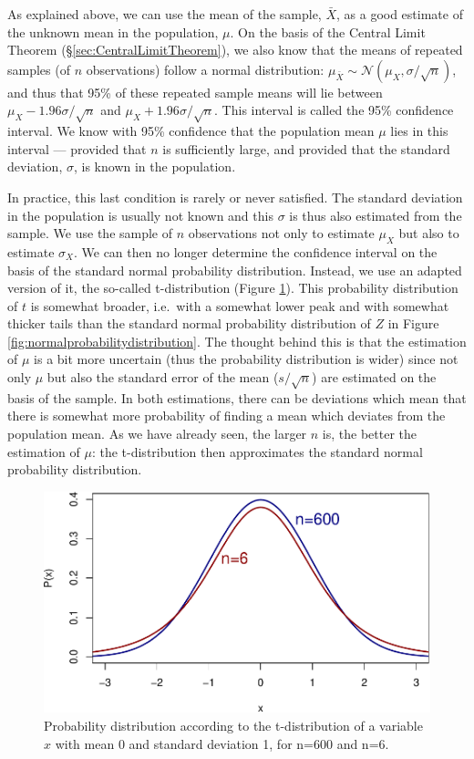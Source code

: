 \documentclass[
]{book}
\begin{document}
As explained above, we can use the mean of the sample, \(\bar{X}\),
as a good estimate of the unknown mean in the population, \(\mu\). On
the basis of the Central Limit Theorem (§\ref{sec:CentralLimitTheorem}),
we also know that the means of repeated samples (of \(n\) observations) follow a
normal distribution: \(\mu_{\bar{X}} \sim \mathcal{N}(\mu_{X},\sigma/\sqrt{n})\),
and thus that 95\% of these repeated sample means will lie between
\(\mu_{X}-1.96\sigma/\sqrt{n}\) and \(\mu_{X}+1.96\sigma/\sqrt{n}\).
This interval is called the 95\% confidence interval. We know with
95\% confidence that the population mean \(\mu\) lies in this interval
--- provided that \(n\) is sufficiently large, and provided that the standard
deviation, \(\sigma\), is known in the population.

In practice, this last condition is rarely or never satisfied. The
standard deviation in the population is usually not known
and this \(\sigma\) is thus also estimated from the sample. We use
the sample of \(n\) observations not only to estimate \(\mu_X\) but also
to estimate \(\sigma_X\). We can then no longer determine the confidence
interval on the basis of the standard normal probability distribution. Instead,
we use an adapted version of it, the so-called t-distribution
(Figure \ref{fig:tprobabilitydistribution}). This probability distribution of
\(t\) is somewhat broader, i.e.~with a somewhat lower peak and with somewhat
thicker tails than the standard normal probability distribution of \(Z\) in
Figure \ref{fig:normalprobabilitydistribution}. The thought behind this is that
the estimation of \(\mu\) is a bit more uncertain (thus the probability distribution
is wider) since not only \(\mu\) but also the standard error of the mean
(\(s/\sqrt{n}\)) are estimated on the basis of the sample. In both estimations, there
can be deviations which mean that there is somewhat more probability of
finding a mean which deviates from the population mean.
As we have already seen, the larger \(n\) is, the better the estimation of \(\mu\):
the t-distribution then approximates the standard normal probability distribution.

\begin{figure}
\centering
\includegraphics{QMS-EN_files/figure-latex/tprobabilitydistribution-1.pdf}
\caption{\label{fig:tprobabilitydistribution}Probability distribution according to the t-distribution of a variable \(x\) with mean 0 and standard deviation 1, for n=600 and n=6.}
\end{figure}
\end{document}
